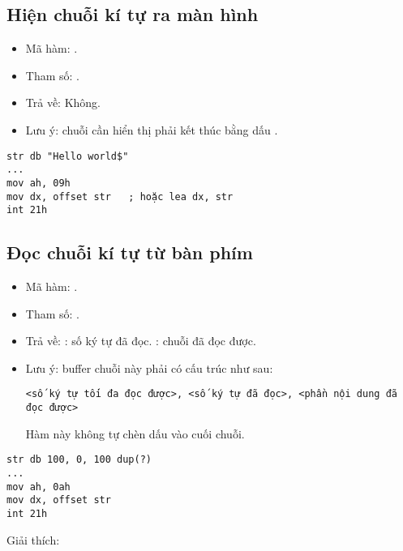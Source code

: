 \documentclass[main.tex]{subfiles}
\begin{document}
\subsection{Hiện chuỗi kí tự ra màn hình}
\begin{itemize}
    \item Mã hàm: .
    \item Tham số: .
    \item Trả về: Không.
    \item Lưu ý: chuỗi cần hiển thị phải kết thúc bằng dấu .
\end{itemize}
\begin{verbatim}
str db "Hello world$"
... 
mov ah, 09h 
mov dx, offset str   ; hoặc lea dx, str
int 21h
\end{verbatim}
\subsection{Đọc chuỗi kí tự từ bàn phím}
\begin{itemize}
    \item Mã hàm: .
    \item Tham số: .
    \item Trả về: \cd{[DX+1]}: số ký tự đã đọc. \cd{[DX+2]}: chuỗi đã đọc được.
    \item Lưu ý: buffer chuỗi này phải có cấu trúc như sau:
    \begin{verbatim}
<số ký tự tối đa đọc được>, <số ký tự đã đọc>, <phần nội dung đã đọc được>
    \end{verbatim}
    \par Hàm này không tự chèn dấu  vào cuối chuỗi.
\end{itemize}
\begin{verbatim}
str db 100, 0, 100 dup(?)
...
mov ah, 0ah 
mov dx, offset str 
int 21h
\end{verbatim}
Giải thích:
\end{document}
